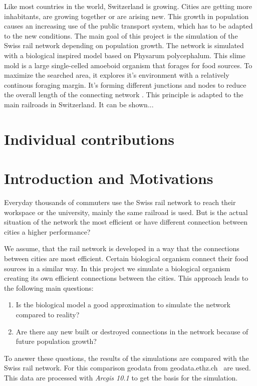 \documentclass[11pt]{scrartcl}
\begin{document}
Like most countries in the world, Switzerland is growing. Cities are getting more inhabitants, are growing together or are arising new. This growth in population causes an increasing use of the public transport system, which has to be adapted to the new conditions. The main goal of this project is the simulation of the Swiss rail network depending on population growth. The network is simulated with a biological inspired model based on Physarum polycephalum. This slime mold is a large single-celled amoeboid organism that forages for food sources. To maximize the searched area, it explores it's environment with a relatively continous foraging margin. It's forming different junctions and nodes to reduce the overall length of the connecting network \cite{network_tokyo}. This principle is adapted to the main railroads in Switzerland. It can be shown...

 


\section{Individual contributions}



\section{Introduction and Motivations}
Everyday thousands of commuters use the Swiss rail network to reach their workspace or the university, mainly the same railroad is used. But is the actual situation of the network the most efficient or have different connection between cities a higher performance?

We assume, that the rail network is developed in a way that the connections between cities are most efficient. Certain biological organism connect their food sources in a similar way. In this project we simulate a biological organism creating its own efficient connections between the cities. This approach leads to the following main questions:

\begin{enumerate}
	\item Is the biological model a good approximation to simulate the network compared to reality?
	\item Are there any new built or destroyed connections in the network because of future population growth?
\end{enumerate}

To answer these questions, the results of the simulations are compared with the Swiss rail network. For this comparison geodata from geodata.ethz.ch~\cite{gis_data} are used. This data are processed with \textit{Arcgis 10.1} to get the basis for the simulation.
\end{document}
